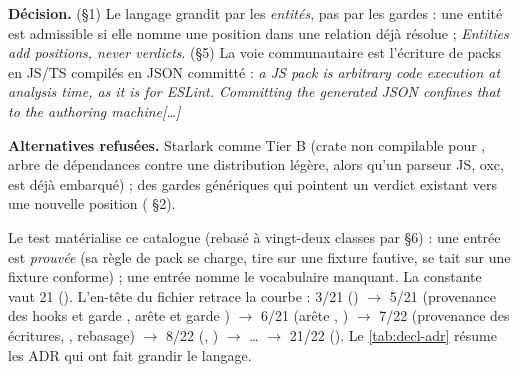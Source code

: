 \begin{decision}
\textbf{Décision.} (§1) Le langage grandit par les \emph{entités}, pas par les gardes : une entité est admissible si elle nomme une position dans une relation déjà résolue ; \og \emph{Entities add positions, never verdicts}\fg{}. (§5) La voie communautaire est l'écriture de packs en JS/TS compilés en JSON committé : \og \emph{a JS pack is arbitrary code execution at analysis time, as it is for ESLint. Committing the generated JSON confines that to the authoring machine[\ldots]}\fg{}

\textbf{Alternatives refusées.} Starlark comme Tier B (crate non compilable pour , arbre de dépendances contre une distribution légère, alors qu'un parseur JS, oxc, est déjà embarqué) ; des gardes génériques qui \og pointent\fg{} un verdict existant vers une nouvelle position ( §2).
\end{decision}

Le test  matérialise ce catalogue (rebasé à vingt-deux classes par  §6) : une entrée  est \emph{prouvée} (sa règle de pack se charge, tire sur une fixture fautive, se tait sur une fixture conforme) ; une entrée  nomme le vocabulaire manquant. La constante  vaut 21 (). L'en-tête du fichier retrace la courbe : 3/21 () $\to$ 5/21 (provenance des hooks et garde , arête  et garde ) $\to$ 6/21 (arête , ) $\to$ 7/22 (provenance des écritures, , rebasage) $\to$ 8/22 (, ) $\to$ \ldots{} $\to$ 21/22 (). Le \cref{tab:decl-adr} résume les ADR qui ont fait grandir le langage.

